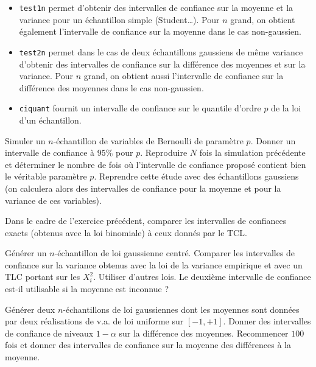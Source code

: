 \begin{itemize}
\item \texttt{test1n} permet d'obtenir des intervalles de confiance sur la
  moyenne et la variance pour un échantillon simple (Student\ldots). Pour $n$
  grand, on obtient également l'intervalle de confiance sur la moyenne dans le
  cas non-gaussien.
\item \texttt{test2n} permet dans le cas de deux échantillons gaussiens de
  même variance d'obtenir des intervalles de confiance sur la différence des
  moyennes et sur la variance. Pour $n$ grand, on obtient aussi l'intervalle
  de confiance sur la différence des moyennes dans le cas non-gaussien.
\item \texttt{ciquant} fournit un intervalle de confiance sur le quantile
  d'ordre $p$ de la loi d'un échantillon.
\end{itemize}

\begin{exo}
  Simuler un $n$-échantillon de variables de Bernoulli de paramètre $p$.
  Donner un intervalle de confiance à $95\%$ pour $p$. Reproduire $N$ fois la
  simulation précédente et déterminer le nombre de fois où l'intervalle de
  confiance proposé contient bien le véritable paramètre $p$. Reprendre cette
  étude avec des échantillons gaussiens (on calculera alors des intervalles de
  confiance pour la moyenne et pour la variance de ces variables).
\end{exo}

\begin{exo}
  Dans le cadre de l'exercice précédent, comparer les intervalles de
  confiances exacts (obtenus avec la loi binomiale) à ceux donnés par le TCL.
\end{exo}

\begin{exo}
  Générer un $n$-échantillon de loi gaussienne centré. Comparer les
  intervalles de confiance sur la variance obtenus avec la loi de la variance
  empirique et avec un TLC portant sur les $X_i^2$. Utiliser d'autres lois. Le
  deuxième intervalle de confiance est-il utilisable si la moyenne est
  inconnue ?
\end{exo}

\begin{exo}
  Générer deux $n$-échantillons de loi gaussiennes dont les moyennes sont
  données par deux réalisations de v.a. de loi uniforme sur $[-1,+1]$. Donner
  des intervalles de confiance de niveaux $1-\alpha$ sur la différence des
  moyennes. Recommencer $100$ fois et donner des intervalles de confiance sur
  la moyenne des différences à la moyenne.
\end{exo}

